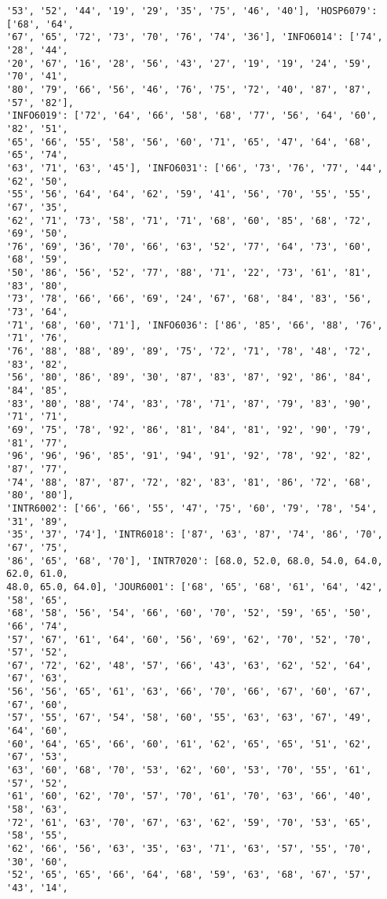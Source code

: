 \documentclass[11pt]{article}
\begin{document}
\begin{Verbatim}[commandchars=\\\{\}]
'53', '52', '44', '19', '29', '35', '75', '46', '40'], 'HOSP6079': ['68', '64',
'67', '65', '72', '73', '70', '76', '74', '36'], 'INFO6014': ['74', '28', '44',
'20', '67', '16', '28', '56', '43', '27', '19', '19', '24', '59', '70', '41',
'80', '79', '66', '56', '46', '76', '75', '72', '40', '87', '87', '57', '82'],
'INFO6019': ['72', '64', '66', '58', '68', '77', '56', '64', '60', '82', '51',
'65', '66', '55', '58', '56', '60', '71', '65', '47', '64', '68', '65', '74',
'63', '71', '63', '45'], 'INFO6031': ['66', '73', '76', '77', '44', '62', '50',
'55', '56', '64', '64', '62', '59', '41', '56', '70', '55', '55', '67', '35',
'62', '71', '73', '58', '71', '71', '68', '60', '85', '68', '72', '69', '50',
'76', '69', '36', '70', '66', '63', '52', '77', '64', '73', '60', '68', '59',
'50', '86', '56', '52', '77', '88', '71', '22', '73', '61', '81', '83', '80',
'73', '78', '66', '66', '69', '24', '67', '68', '84', '83', '56', '73', '64',
'71', '68', '60', '71'], 'INFO6036': ['86', '85', '66', '88', '76', '71', '76',
'76', '88', '88', '89', '89', '75', '72', '71', '78', '48', '72', '83', '82',
'56', '80', '86', '89', '30', '87', '83', '87', '92', '86', '84', '84', '85',
'83', '80', '88', '74', '83', '78', '71', '87', '79', '83', '90', '71', '71',
'69', '75', '78', '92', '86', '81', '84', '81', '92', '90', '79', '81', '77',
'96', '96', '96', '85', '91', '94', '91', '92', '78', '92', '82', '87', '77',
'74', '88', '87', '87', '72', '82', '83', '81', '86', '72', '68', '80', '80'],
'INTR6002': ['66', '66', '55', '47', '75', '60', '79', '78', '54', '31', '89',
'35', '37', '74'], 'INTR6018': ['87', '63', '87', '74', '86', '70', '67', '75',
'86', '65', '68', '70'], 'INTR7020': [68.0, 52.0, 68.0, 54.0, 64.0, 62.0, 61.0,
48.0, 65.0, 64.0], 'JOUR6001': ['68', '65', '68', '61', '64', '42', '58', '65',
'68', '58', '56', '54', '66', '60', '70', '52', '59', '65', '50', '66', '74',
'57', '67', '61', '64', '60', '56', '69', '62', '70', '52', '70', '57', '52',
'67', '72', '62', '48', '57', '66', '43', '63', '62', '52', '64', '67', '63',
'56', '56', '65', '61', '63', '66', '70', '66', '67', '60', '67', '67', '60',
'57', '55', '67', '54', '58', '60', '55', '63', '63', '67', '49', '64', '60',
'60', '64', '65', '66', '60', '61', '62', '65', '65', '51', '62', '67', '53',
'63', '60', '68', '70', '53', '62', '60', '53', '70', '55', '61', '57', '52',
'61', '60', '62', '70', '57', '70', '61', '70', '63', '66', '40', '58', '63',
'72', '61', '63', '70', '67', '63', '62', '59', '70', '53', '65', '58', '55',
'62', '66', '56', '63', '35', '63', '71', '63', '57', '55', '70', '30', '60',
'52', '65', '65', '66', '64', '68', '59', '63', '68', '67', '57', '43', '14',

\end{Verbatim}
\end{document}
